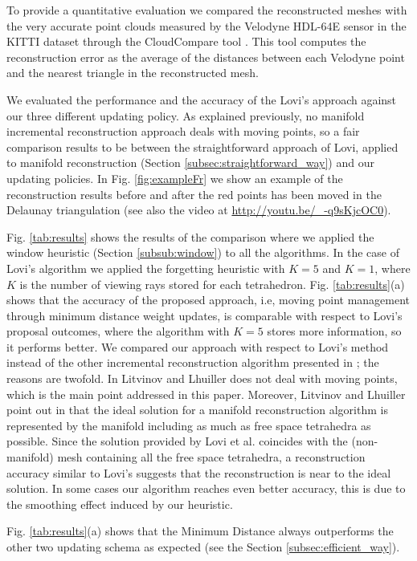 To provide a quantitative evaluation we compared the reconstructed meshes with the very accurate point clouds measured by the Velodyne HDL-64E sensor in the KITTI dataset through the CloudCompare tool \cite{CloudCompare}.
This tool computes the reconstruction error as the average of the distances between each Velodyne point and the nearest triangle in the reconstructed mesh.

We evaluated the performance and the accuracy of the Lovi's approach against our three different updating policy.
As explained previously, no manifold incremental reconstruction approach deals with moving points, so a fair comparison results to be between the straightforward approach of Lovi, applied to manifold reconstruction (Section \ref{subsec:straightforward_way}) and our updating policies. In Fig. \ref{fig:exampleFr} we show an example of the reconstruction results before and after the red points has been moved in the Delaunay triangulation (see also the video at \url{http://youtu.be/_-q9sKjcOC0}).

Fig. \ref{tab:results} shows the results of the comparison where we applied the window heuristic (Section \ref{subsub:window}) to all the algorithms. In the case of Lovi's algorithm we applied the forgetting heuristic with $K=5$ and $K=1$, where $K$ is the number of viewing rays stored for each tetrahedron.
Fig.  \ref{tab:results}(a) shows that the accuracy of the proposed approach, i.e, moving point management through minimum distance weight updates, is comparable with respect to Lovi's proposal outcomes, where the algorithm with $K=5$ stores more information, so it performs better.
We compared our approach with respect to Lovi's method instead of the other incremental reconstruction algorithm presented in \cite{litvinov_lhuillier_13}; the reasons are twofold. 
In \cite{litvinov_lhuillier_13} Litvinov and Lhuiller does not deal with moving points, which is the main point addressed in this paper. Moreover, Litvinov and Lhuiller point out in \cite{litvinov_Lhiuller14} that the ideal solution for a manifold reconstruction algorithm is represented by the manifold including as much as free space tetrahedra as possible. Since the solution provided by Lovi et al. coincides with the (non-manifold) mesh containing all the free space tetrahedra, a reconstruction accuracy similar to Lovi's suggests that the reconstruction is near to the ideal solution. In some cases our algorithm reaches even better accuracy, this is due to the smoothing effect induced by our heuristic.


Fig. \ref{tab:results}(a) shows that the Minimum Distance always outperforms the other two updating schema as expected (see the Section \ref{subsec:efficient_way}).

